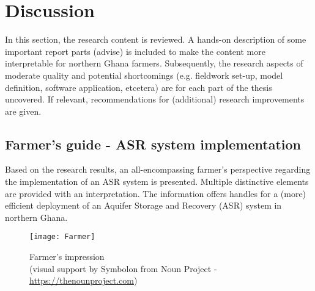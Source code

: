 \chapter{Discussion}
\label{chapter:discussion}
In this section, the research content is reviewed. A hands-on description of some important report parts (advise) is included to make the content more interpretable for northern Ghana farmers. Subsequently, the research aspects of moderate quality and potential shortcomings (e.g. fieldwork set-up, model definition, software application, etcetera) are for each part of the thesis uncovered. If relevant, recommendations for (additional) research improvements are given. 

\section{Farmer's guide - ASR system implementation}
\label{sec:farmers_guide}
Based on the research results, an all-encompassing farmer's perspective regarding the implementation of an ASR system is presented. Multiple distinctive elements are provided with an interpretation. The information offers handles for a (more) efficient deployment of an Aquifer Storage and Recovery (ASR) system in northern Ghana. 


\begin{figure}[h!]
 \centering
 \texttt{[image: Farmer]}
 \captionsetup{justification=centering} 
 \caption[Farmer's impression]{Farmer's impression \\ (visual support by Symbolon from Noun Project - \url{https://thenounproject.com})}
 \label{fig:Farmer}
\end{figure}

